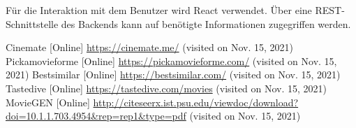 \documentclass[conference]{IEEEtran}
\begin{document}
Für die Interaktion mit dem Benutzer wird React verwendet. Über eine REST-Schnittstelle des Backends kann auf benötigte Informationen zugegriffen werden.


\begin{thebibliography}{0}
	Cinemate [Online] \url{https://cinemate.me/} (visited on Nov. 15, 2021)
	Pickamovieforme [Online] \url{https://pickamovieforme.com/} (visited on Nov. 15, 2021)
	Bestsimilar [Online] \url{https://bestsimilar.com/} (visited on Nov. 15, 2021)
	Tastedive [Online] \url{https://tastedive.com/movies} (visited on Nov. 15, 2021)
	MovieGEN [Online] \url{http://citeseerx.ist.psu.edu/viewdoc/download?doi=10.1.1.703.4954\&rep=rep1\&type=pdf} (visited on Nov. 15, 2021)
\end{thebibliography}
\vspace{12pt}
\end{document}
